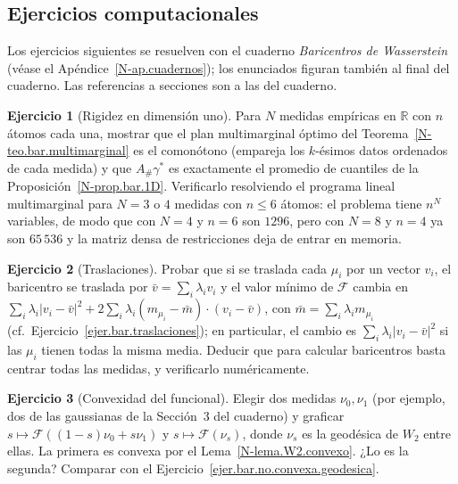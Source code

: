 \documentclass[11pt,a4paper]{amsart}
\newcounter{chapter}
\newcommand{\R}{{\mathbb R}}
\theoremstyle{remark}
\theoremstyle{definition}
\newtheorem{ejercicio}{Ejercicio}[chapter]
\numberwithin{subsection}{section}
\numberwithin{equation}{section}
\begin{document}
\subsection*{Ejercicios computacionales}

Los ejercicios siguientes se resuelven con el cuaderno \emph{Baricentros de
Wasserstein} (véase el Apéndice~\ref{N-ap.cuadernos}); los enunciados figuran
también al final del cuaderno. Las referencias a secciones son a las del
cuaderno.

\begin{ejercicio}[Rigidez en dimensión uno]\label{ejc.bar.1D}
Para $N$ medidas empíricas en $\R$ con $n$ átomos cada una, mostrar que el
plan multimarginal óptimo del Teorema~\ref{N-teo.bar.multimarginal} es el
comonótono (empareja los $k$-ésimos datos ordenados de cada medida) y que
$A_\#\gamma^*$ es exactamente el promedio de cuantiles de la
Proposición~\ref{N-prop.bar.1D}. Verificarlo resolviendo el programa lineal
multimarginal para $N=3$ o $4$ medidas con $n\le6$ átomos: el problema tiene
$n^N$ variables, de modo que con $N=4$ y $n=6$ son $1296$, pero con $N=8$ y
$n=4$ ya son $65\,536$ y la matriz densa de restricciones deja de entrar en
memoria.
\end{ejercicio}

\begin{ejercicio}[Traslaciones]\label{ejc.bar.traslaciones}
Probar que si se traslada cada $\mu_i$ por un vector $v_i$, el baricentro se
traslada por $\bar v=\sum_i\lambda_iv_i$ y el valor mínimo de $\mathcal F$
cambia en $\sum_i\lambda_i|v_i-\bar v|^2+2\sum_i\lambda_i(m_{\mu_i}-\bar m)\cdot(v_i-\bar v)$,
con $\bar m=\sum_i\lambda_im_{\mu_i}$ (cf.\
Ejercicio~\ref{ejer.bar.traslaciones}); en particular, el cambio es
$\sum_i\lambda_i|v_i-\bar v|^2$ si las $\mu_i$ tienen todas la misma media.
Deducir que para calcular baricentros basta centrar todas las medidas, y
verificarlo numéricamente.
\end{ejercicio}

\begin{ejercicio}[Convexidad del funcional]\label{ejc.bar.convexidad}
Elegir dos medidas $\nu_0,\nu_1$ (por ejemplo, dos de las gaussianas de la
Sección~3 del cuaderno) y graficar $s\mapsto\mathcal F((1-s)\nu_0+s\nu_1)$ y
$s\mapsto\mathcal F(\nu_s)$, donde $\nu_s$ es la geodésica de $W_2$ entre
ellas. La primera es convexa por el Lema~\ref{N-lema.W2.convexo}. ¿Lo es la
segunda? Comparar con el Ejercicio~\ref{ejer.bar.no.convexa.geodesica}.
\end{ejercicio}
\end{document}
